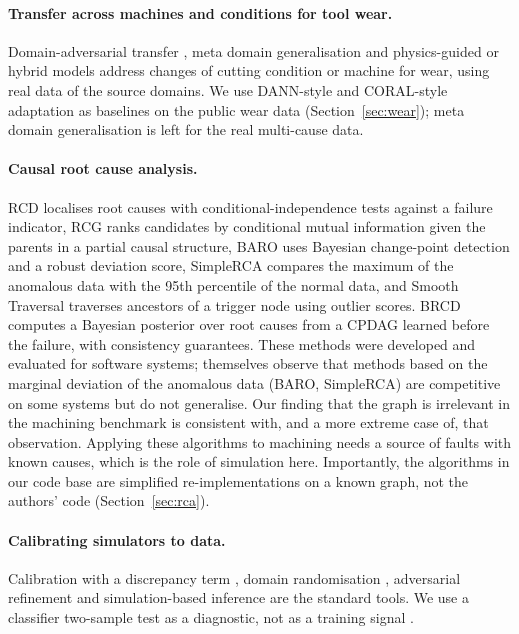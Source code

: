 \documentclass[11pt]{article}
\begin{document}
\paragraph{Transfer across machines and conditions for tool wear.}
Domain-adversarial transfer \citep{wang2020datwear}, meta domain generalisation \citep{li2023metadg} and physics-guided or hybrid models \citep{li2025physguided,yang2022hybridwear} address changes of cutting condition or machine for wear, using real data of the source domains. We use DANN-style and CORAL-style adaptation as baselines on the public wear data (Section~\ref{sec:wear}); meta domain generalisation is left for the real multi-cause data.

\paragraph{Causal root cause analysis.}
RCD \citep{ikram2022rcd} localises root causes with conditional-independence tests against a failure indicator, RCG \citep{ikram2025rcg} ranks candidates by conditional mutual information given the parents in a partial causal structure, BARO \citep{pham2024baro} uses Bayesian change-point detection and a robust deviation score, SimpleRCA \citep{fang2025simplerca} compares the maximum of the anomalous data with the 95th percentile of the normal data, and Smooth Traversal \citep{orchard2025} traverses ancestors of a trigger node using outlier scores. BRCD \citep{lee2026brcd} computes a Bayesian posterior over root causes from a CPDAG learned before the failure, with consistency guarantees. These methods were developed and evaluated for software systems; \citet{lee2026brcd} themselves observe that methods based on the marginal deviation of the anomalous data (BARO, SimpleRCA) are competitive on some systems but do not generalise. Our finding that the graph is irrelevant in the machining benchmark is consistent with, and a more extreme case of, that observation. Applying these algorithms to machining needs a source of faults with known causes, which is the role of simulation here. Importantly, the algorithms in our code base are simplified re-implementations on a known graph, not the authors' code (Section~\ref{sec:rca}).

\paragraph{Calibrating simulators to data.}
Calibration with a discrepancy term \citep{kennedy2001}, domain randomisation \citep{tobin2017}, adversarial refinement \citep{shrivastava2017} and simulation-based inference \citep{cranmer2020} are the standard tools. We use a classifier two-sample test as a diagnostic, not as a training signal \citep{lopezpaz2017c2st}.
\end{document}
